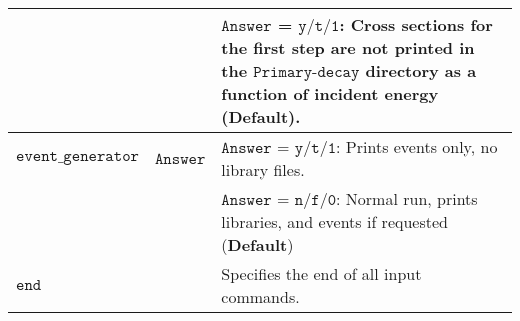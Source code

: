\documentclass[
10pt,
showpacs,preprintnumbers,footinbib,
amsfonts,amsmath,amssymb,
aps,
prc,twocolumn,groupedaddress,superscriptaddress,
showkeys,
nofootinbib
]{revtex4-1}
\begin{document}
\begin{center}
\begin{tabular}{| p{4cm} | p{4cm} | p{9cm} |}
  &  &  ${\texttt{Answer}}$ = ${\texttt{y/t/1}}$: Cross sections for the first step are {\bf not} printed in the ${\texttt{Primary-decay}}$ directory as a function of incident energy ({\bf Default}). \\
\hline
${\texttt{event\_generator}}$ & ${\texttt{Answer}}$ & ${\texttt{Answer}}$ = ${\texttt{y/t/1}}$: Prints events only, no library files. \\
   &    & ${\texttt{Answer}}$ = ${\texttt{n/f/0}}$: Normal run, prints libraries, and events if requested ({\bf Default}) \\\hline
${\texttt{end}}$ & & Specifies the end of all input commands.\\
\hline
\end{tabular}
\end{center}

%
%
\end{document}
